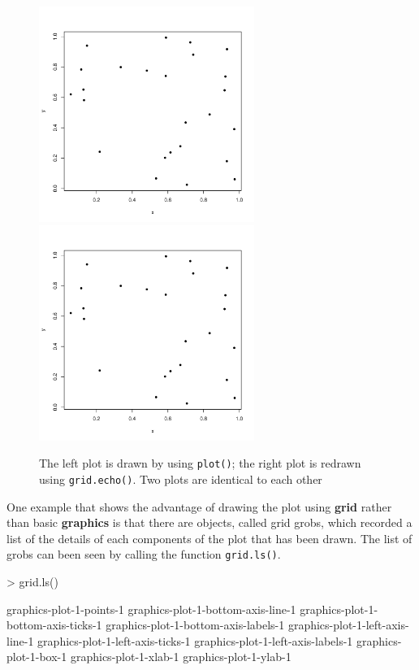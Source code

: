 \documentclass[11pt]{report}
\begin{document}
\begin{figure}[h]
	\begin{center}
		\includegraphics[height = 7cm, width = 7cm]{figure/report_basic_demo_1.pdf}
		\includegraphics[height = 7cm, width = 7cm]{figure/report_basic_demo_1.pdf}
		\caption{The left plot is drawn by using \texttt{plot()}; the right plot is redrawn using \texttt{grid.echo()}. Two plots are identical to each other}
		\label{figure_1.1}
	\end{center}
\end{figure}
\newpage
One example that shows the advantage of drawing the plot using \textbf{grid} rather than basic \textbf{graphics} is that there are objects, called grid grobs, which recorded a list of the details of each components of the plot that has been drawn. The list of grobs can been seen by calling the function \texttt{grid.ls()}.
\begin{Schunk}
\begin{Sinput}
> grid.ls()
\end{Sinput}
\begin{Soutput}
graphics-plot-1-points-1
graphics-plot-1-bottom-axis-line-1
graphics-plot-1-bottom-axis-ticks-1
graphics-plot-1-bottom-axis-labels-1
graphics-plot-1-left-axis-line-1
graphics-plot-1-left-axis-ticks-1
graphics-plot-1-left-axis-labels-1
graphics-plot-1-box-1
graphics-plot-1-xlab-1
graphics-plot-1-ylab-1
\end{Soutput}
\end{Schunk}
\end{document}
